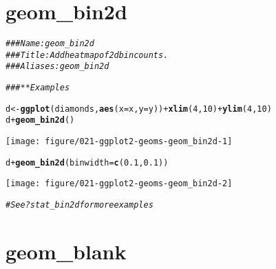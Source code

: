 \documentclass[a4paper,titlepage]{tufte-handout}\usepackage[]{graphicx}\usepackage[]{color}
\makeatletter
\def\maxwidth{ %
  \ifdim\Gin@nat@width>\linewidth
    \linewidth
  \else
    \Gin@nat@width
  \fi
}
\newcommand{\hlnum}[1]{\textcolor[rgb]{0.686,0.059,0.569}{#1}}%
\newcommand{\hlcom}[1]{\textcolor[rgb]{0.678,0.584,0.686}{\textit{#1}}}%
\newcommand{\hlopt}[1]{\textcolor[rgb]{0,0,0}{#1}}%
\newcommand{\hlstd}[1]{\textcolor[rgb]{0.345,0.345,0.345}{#1}}%
\newcommand{\hlkwb}[1]{\textcolor[rgb]{0.69,0.353,0.396}{#1}}%
\newcommand{\hlkwc}[1]{\textcolor[rgb]{0.333,0.667,0.333}{#1}}%
\newcommand{\hlkwd}[1]{\textcolor[rgb]{0.737,0.353,0.396}{\textbf{#1}}}%
\newenvironment{kframe}{%
 \def\at@end@of@kframe{}%
 \ifinner\ifhmode%
  \def\at@end@of@kframe{\end{minipage}}%
  \begin{minipage}{\columnwidth}%
 \fi\fi%
 \def\FrameCommand##1{\hskip\@totalleftmargin \hskip-\fboxsep
 \colorbox{shadecolor}{##1}\hskip-\fboxsep
     \hskip-\linewidth \hskip-\@totalleftmargin \hskip\columnwidth}%
 \MakeFramed {\advance\hsize-\width
   \@totalleftmargin\z@ \linewidth\hsize
   \@setminipage}}%
 {\par\unskip\endMakeFramed%
 \at@end@of@kframe}
\newenvironment{knitrout}{}{} %
\makeatother
\begin{document}
\section{geom\_bin2d}

\begin{knitrout}
\color{fgcolor}\begin{kframe}
\begin{alltt}
\hlcom{### Name: geom_bin2d}
\hlcom{### Title: Add heatmap of 2d bin counts.}
\hlcom{### Aliases: geom_bin2d}

\hlcom{### ** Examples}

\hlstd{d} \hlkwb{<-} \hlkwd{ggplot}\hlstd{(diamonds,} \hlkwd{aes}\hlstd{(}\hlkwc{x} \hlstd{= x,} \hlkwc{y} \hlstd{= y))} \hlopt{+} \hlkwd{xlim}\hlstd{(}\hlnum{4}\hlstd{,}\hlnum{10}\hlstd{)} \hlopt{+} \hlkwd{ylim}\hlstd{(}\hlnum{4}\hlstd{,}\hlnum{10}\hlstd{)}
\hlstd{d} \hlopt{+} \hlkwd{geom_bin2d}\hlstd{()}
\end{alltt}
\end{kframe}
\texttt{[image: figure/021-ggplot2-geoms-geom\_bin2d-1]} 
\begin{kframe}\begin{alltt}
\hlstd{d} \hlopt{+} \hlkwd{geom_bin2d}\hlstd{(}\hlkwc{binwidth} \hlstd{=} \hlkwd{c}\hlstd{(}\hlnum{0.1}\hlstd{,} \hlnum{0.1}\hlstd{))}
\end{alltt}
\end{kframe}
\texttt{[image: figure/021-ggplot2-geoms-geom\_bin2d-2]} 
\begin{kframe}\begin{alltt}
\hlcom{# See ?stat_bin2d for more examples}
\end{alltt}
\end{kframe}
\end{knitrout}


\section{geom\_blank}
\end{document}
